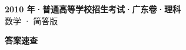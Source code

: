\documentclass[zihao=-4, a4paper]{ctexart}
\begin{document}
\begin{center}
  {\Large\bfseries 2010 年·普通高等学校招生考试·广东卷·理科}\\[4pt]
  {\large 数学 · 简答版}
\end{center}
\medskip
{}

\clearpage
{}
\begin{center}{\Large\bfseries 答案速查}\end{center}
\medskip

\end{document}
